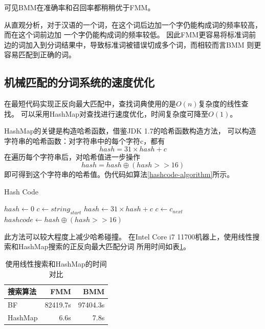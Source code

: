 可见BMM在准确率和召回率都稍稍优于FMM。

从直观分析，对于汉语的一个词，在这个词后边加一个字仍能构成词的频率较高，而在这个词前边加
一个字仍能构成词的频率较低。
因此FMM更容易将标准词前边的词加入到分词结果中，导致标准词被错误切成多个词，而相较而言BMM
则更容易匹配到正确的词。

\subsection{机械匹配的分词系统的速度优化}

在最短代码实现正反向最大匹配中，查找词典使用的是$O(n)$复杂度的线性查找。
可以采用HashMap对查找进行速度优化，时间复杂度可降至$O(1)$。

HashMap的关键是构造哈希函数，借鉴JDK 1.7的哈希函数构造方法，
可以构造字符串的哈希函数：对字符串中的每个字符c，都有
\begin{equation}
  \label{hash31}
  hash = 31 \times hash + c
\end{equation}
在遍历每个字符串后，对哈希值进一步操作
\begin{equation}
  hash = hash \oplus (hash >> 16)
\end{equation}
即可得到这个字符串的哈希值。伪代码如算法\ref{hashcode-algorithm}所示。
\begin{algorithm}
  \caption{Hash Code}
  \begin{algorithmic}
    \STATE $hash \gets 0$
    \STATE $c \gets string_{start}$
    \STATE $hash \gets 31 \times hash + c$
    \STATE $c \gets c_{next}$
    \ENDWHILE
    \STATE $hashcode \gets hash \oplus (hash >> 16)$
  \end{algorithmic}
  \label{hashcode-algorithm}
\end{algorithm}

此方法可以较大程度上减少哈希碰撞\citep{bajracharyareview}。
在Intel Core i7 11700机器上，使用线性搜索和HashMap搜索的正反向最大匹配分词
所用时间如表\ref{plain_vs_hashmap_time}。

\begin{table}[H]
  \centering
  \begin{tabular}{lrr}
    \hline
    \textbf{搜索算法} & \textbf{FMM} & \textbf{BMM} \\
    \hline
    BF                & 82419.7s     & 97404.3s     \\
    HashMap           & 6.6s         & 7.8s         \\
    \hline
  \end{tabular}
  \caption{使用线性搜索和HashMap的时间对比}
  \label{plain_vs_hashmap_time}
\end{table}

